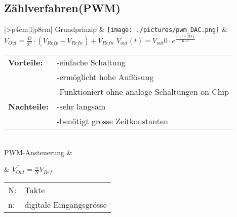 \subsection{Zählverfahren(PWM)}
\begin{longtable}{|>{\bfseries}p{4cm}|l|p{8cm}|}
	\hline 
	Grundprinzip \hartl{466}
	& \texttt{[image: ./pictures/pwm\_DAC.png]}
	& $ V_{Out}=\frac{D}{2^n} \cdot (V_{Refp}-V_{Refn})+V_{Refn} $ \newline
	$V_{out}(t)= V_{out}0 \cdot e^{\frac{-(t-TO)}{R \cdot C}}$\newline
	\begin{tabular}{lp{5cm}}
    \textbf{Vorteile:} 
      &-einfache Schaltung \\
      &-ermöglicht hohe Auflösung \\
      &-Funktioniert ohne analoge Schaltungen on Chip \\
    
    \textbf{Nachteile:}
      &-sehr langsam \\
      &-benötigt grosse Zeitkonstanten 
  \end{tabular}
	\\ \hline
	PWM-Ansteuerung 
	& \parbox[c][2cm]{6cm}{}
	& $\bar{V_{Out}}=\frac{n}{N}V_{Ref}$
	  \begin{tabular}{ll}
		N:&Takte\\
		n:&digitale Eingangsgrösse
	  \end{tabular}
	\\ \hline
\end{longtable}

\newpage

